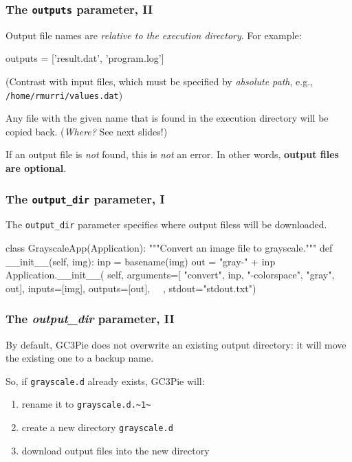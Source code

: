 \documentclass[english,serif,mathserif,xcolor=pdftex,dvipsnames,table]{beamer}
\begin{document}
\begin{frame}[fragile]
  \frametitle{The \texttt{outputs} parameter, II}

  Output file names are \emph{relative to the execution directory}.
  For example:
  \begin{python}
    outputs = ['result.dat', 'program.log']
  \end{python}

  \+
  (Contrast with input files, which must be specified by
  \emph{absolute path}, e.g., \texttt{/home/rmurri/values.dat})

  \+
  Any file with the given name that is found in the execution
  directory will be copied back. (\emph{Where?} See next slides!)

  \+
  If an output file is \emph{not} found, this is \emph{not} an
  error. In other words, \textbf{output files are optional}.
\end{frame}


\begin{frame}[fragile]
\frametitle{The \texttt{output\_dir} parameter, I}

The \lstinline|output_dir| parameter specifies where output filess
will be downloaded.

\+
\begin{python}
class GrayscaleApp(Application):
  """Convert an image file to grayscale."""
  def __init__(self, img):
    inp = basename(img)
    out = "gray-" + inp
    Application.__init__(
      self,
      arguments=[
        "convert", inp, "-colorspace", "gray", out],
      inputs=[img],
      outputs=[out],
      ~~,
      stdout="stdout.txt")
\end{python}
\end{frame}


\begin{frame}[fragile]
  \frametitle{The \emph{output\_dir} parameter, II}

  By default, GC3Pie does not overwrite an existing output directory:
  it will move the existing one to a backup name.

  \+
  So, if \texttt{grayscale.d} already exists, GC3Pie will:
  \begin{enumerate}
  \item rename it to \lstinline|grayscale.d.~1~|
  \item create a new directory \texttt{grayscale.d}
  \item download output files into the new directory
  \end{enumerate}
\end{frame}
\end{document}
